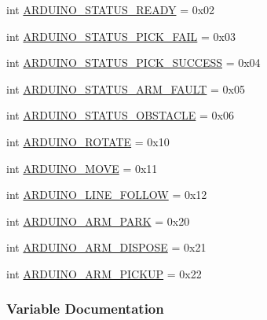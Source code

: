 \begin{DoxyCompactItemize}
\item 
int \mbox{\hyperlink{namespaceconstants_a92e64e2f09948e66a5c52e4bb6d0b1c3}{A\+R\+D\+U\+I\+N\+O\+\_\+\+S\+T\+A\+T\+U\+S\+\_\+\+R\+E\+A\+DY}} = 0x02
\item 
int \mbox{\hyperlink{namespaceconstants_ad2f83c4703b56c7856164f300c88a266}{A\+R\+D\+U\+I\+N\+O\+\_\+\+S\+T\+A\+T\+U\+S\+\_\+\+P\+I\+C\+K\+\_\+\+F\+A\+IL}} = 0x03
\item 
int \mbox{\hyperlink{namespaceconstants_a5567eabdcef157ce5b607bab1ad6e5af}{A\+R\+D\+U\+I\+N\+O\+\_\+\+S\+T\+A\+T\+U\+S\+\_\+\+P\+I\+C\+K\+\_\+\+S\+U\+C\+C\+E\+SS}} = 0x04
\item 
int \mbox{\hyperlink{namespaceconstants_a2d478e3a682d0ada3f13bfa1a3b0543a}{A\+R\+D\+U\+I\+N\+O\+\_\+\+S\+T\+A\+T\+U\+S\+\_\+\+A\+R\+M\+\_\+\+F\+A\+U\+LT}} = 0x05
\item 
int \mbox{\hyperlink{namespaceconstants_abc0b60b03096dc294325d894c7418ae2}{A\+R\+D\+U\+I\+N\+O\+\_\+\+S\+T\+A\+T\+U\+S\+\_\+\+O\+B\+S\+T\+A\+C\+LE}} = 0x06
\item 
int \mbox{\hyperlink{namespaceconstants_ae9932657445a57d6c7343fd8866ed04e}{A\+R\+D\+U\+I\+N\+O\+\_\+\+R\+O\+T\+A\+TE}} = 0x10
\item 
int \mbox{\hyperlink{namespaceconstants_acf86d86890beb6e2039a03726e431d71}{A\+R\+D\+U\+I\+N\+O\+\_\+\+M\+O\+VE}} = 0x11
\item 
int \mbox{\hyperlink{namespaceconstants_a7944abd6ac614939a63da46e49d770f4}{A\+R\+D\+U\+I\+N\+O\+\_\+\+L\+I\+N\+E\+\_\+\+F\+O\+L\+L\+OW}} = 0x12
\item 
int \mbox{\hyperlink{namespaceconstants_a53723c1862d52155f319a0d173230568}{A\+R\+D\+U\+I\+N\+O\+\_\+\+A\+R\+M\+\_\+\+P\+A\+RK}} = 0x20
\item 
int \mbox{\hyperlink{namespaceconstants_a868e5ebad4edc27cb1c6dc313cec7094}{A\+R\+D\+U\+I\+N\+O\+\_\+\+A\+R\+M\+\_\+\+D\+I\+S\+P\+O\+SE}} = 0x21
\item 
int \mbox{\hyperlink{namespaceconstants_a17f52a2eba1281743ebe4589f0fdf3f3}{A\+R\+D\+U\+I\+N\+O\+\_\+\+A\+R\+M\+\_\+\+P\+I\+C\+K\+UP}} = 0x22
\end{DoxyCompactItemize}


\subsubsection{Variable Documentation}
\mbox{\label{namespaceconstants_a868e5ebad4edc27cb1c6dc313cec7094}} 
